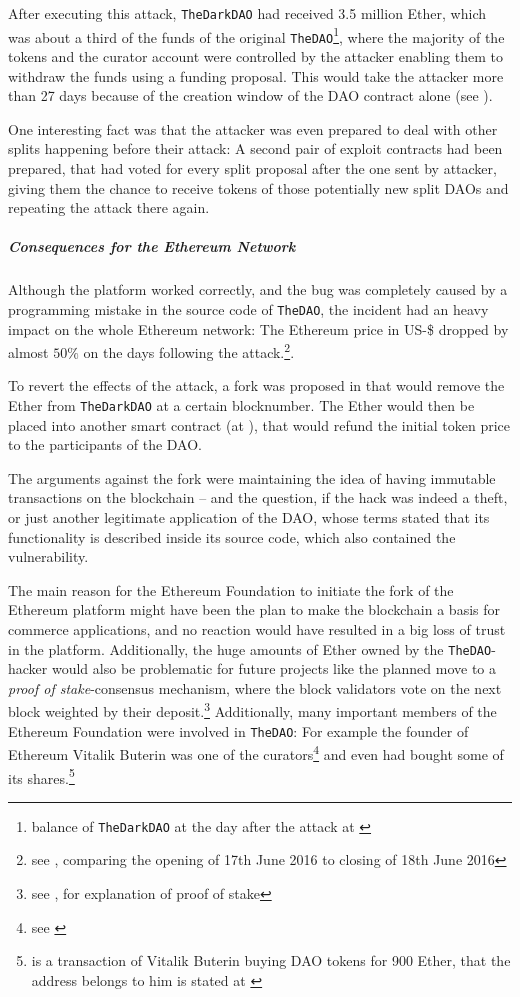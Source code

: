After executing this attack, \texttt{TheDarkDAO} had received 3.5 million Ether, which was about a third of the funds of the original \texttt{TheDAO}\footnote{balance of \texttt{TheDarkDAO} at the day after the attack at \cite{etherscan:darkdao:balanceafter}}, where the majority of the tokens and the curator account were controlled by the attacker enabling them to withdraw the funds using a funding proposal. This would take the attacker more than 27 days because of the creation window of the DAO contract alone (see \cite{ethereum:redaovulnerability}).

One interesting fact was that the attacker was even prepared to deal with other splits happening before their attack: A second pair of exploit contracts had been prepared, that had voted for every split proposal after the one sent by attacker, giving them the chance to receive tokens of those potentially new split DAOs and repeating the attack there again.

\subparagraph{Consequences for the Ethereum Network}
Although the platform worked correctly, and the bug was completely caused by a programming mistake in the source code of \texttt{TheDAO}, the incident had an heavy impact on the whole Ethereum network: The Ethereum price in US-\$ dropped by almost \( 50 \% \) on the days following the attack.\footnote{see \cite{coinmarketcap:ethervaluedao}, comparing the opening of 17th June 2016 to closing of 18th June 2016}.

To revert the effects of the attack, a fork was proposed in \cite{slockit:hardfork} that would remove the Ether from \texttt{TheDarkDAO} at a certain blocknumber. The Ether would then be placed into another smart contract (at \cite{etherscan:withdrawdao}), that would refund the initial token price to the participants of the DAO.

The arguments against the fork were maintaining the idea of having immutable transactions on the blockchain -- and the question, if the hack was indeed a theft, or just another legitimate application of the DAO, whose terms stated that its functionality is described inside its source code, which also contained the vulnerability.

The main reason for the Ethereum Foundation to initiate the fork of the Ethereum platform might have been the plan to make the blockchain a basis for commerce applications, and no reaction would have resulted in a big loss of trust in the platform. Additionally, the huge amounts of Ether owned by the \texttt{TheDAO}-hacker would also be problematic for future projects like the planned move to a \textit{proof of stake}-consensus mechanism, where the block validators vote on the next block weighted by their deposit.\footnote{see \cite{coindesk:daohackjournalists}, \cite[Proof of Stake FAQ]{ethereum:wiki} for explanation of proof of stake} Additionally, many important members of the Ethereum Foundation were involved in \texttt{TheDAO}: For example the founder of Ethereum Vitalik Buterin was one of the curators\footnote{see \cite{slockit:curators}} and even had bought some of its shares.\footnote{\cite{etherscan:buterindao} is a transaction of Vitalik Buterin buying DAO tokens for 900 Ether, that the address belongs to him is stated at \cite{unblock:buterinaddress}}

